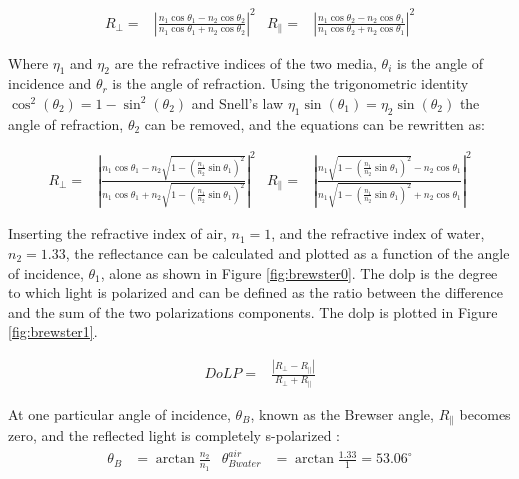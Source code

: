 \begin{align}
    R_\perp =         & \left|{\frac {n_{1}\cos \theta _1-n_{2}\cos \theta _2}{n_{1}\cos \theta _1+n_{2}\cos \theta _2}}\right|^{2}
                      &
    R_\parallel     = & \left|{\frac {n_{1}\cos \theta _2-n_{2}\cos \theta _1}{n_{1}\cos \theta _2+n_{2}\cos \theta _1}}\right|^{2}
\end{align}

Where  $\eta_1$ and $\eta_2$ are the refractive indices of the two media,
$\theta_i$ is the angle of incidence and $\theta_r$ is the angle of refraction.
Using the trigonometric identity $ \cos^2{\left(\theta_2 \right)} = 1- \sin^2{\left(\theta_2 \right)}$ and Snell's law $\eta_1 \sin{\left(\theta_1 \right)} = \eta_2 \sin{\left(\theta_2 \right)}$ the angle of refraction, $\theta_2$ can be removed, and the equations can be rewritten as:

\begin{align}
    R_\perp =         & \left|{\frac {n_{1}\cos \theta _1-n_{2}{\sqrt {1-\left({\frac {n_{1}}{n_{2}}}\sin \theta _1\right)^{2}}}}{n_{1}\cos \theta _1+n_{2}{\sqrt {1-\left({\frac {n_{1}}{n_{2}}}\sin \theta _1\right)^{2}}}}}\right|^{2}
                      &
    R_\parallel     = & \left|{\frac {n_{1}{\sqrt {1-\left({\frac {n_{1}}{n_{2}}}\sin \theta _1\right)^{2}}}-n_{2}\cos \theta _1}{n_{1}{\sqrt {1-\left({\frac {n_{1}}{n_{2}}}\sin \theta _1\right)^{2}}}+n_{2}\cos \theta _1}}\right|^{2}
\end{align}


Inserting the refractive index of air, $n_1 = 1$, and the refractive index of water, $n_2 = 1.33$, the reflectance can be calculated and plotted as a function of the angle of incidence, $\theta_1$, alone as shown in Figure \ref{fig:brewster0}.
The \gls{dolp} is the degree to which light is polarized and can be defined as the ratio between the difference and the sum of the two polarizations components.
The \gls{dolp} is plotted in Figure \ref{fig:brewster1}.

\begin{align}
    DoLP= & \frac{\left | R_\perp - R_\parallel \right |}{R_\perp + R_\parallel}
\end{align}

At one particular angle of incidence, $\theta_B$, known as the Brewser angle, $R_\parallel$ becomes zero, and the reflected light is completely s-polarized \cite{BrewsterAngle2024}:
\begin{align}
    \theta_B & = \arctan{\frac{n_2}{n_1}} & \theta^{air}_{Bwater} & = \arctan{\frac{1.33}{1}} = 53.06^\circ
\end{align}

